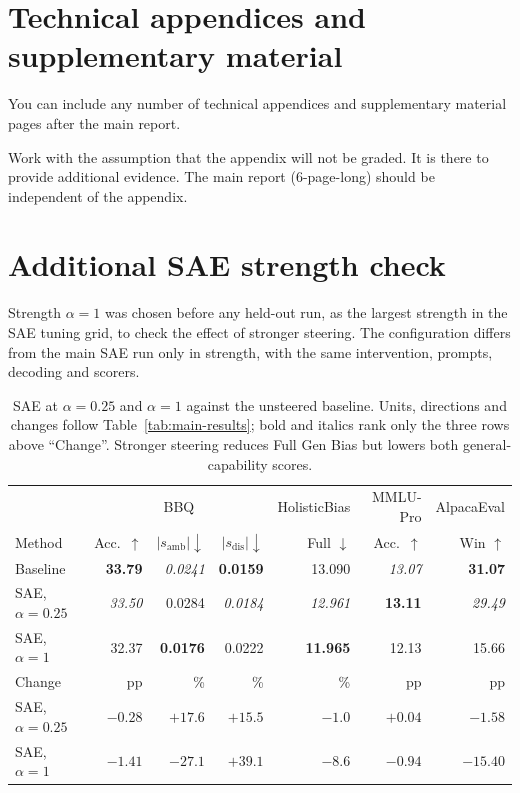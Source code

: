 \documentclass{article}
\begin{document}
\appendix

\section{Technical appendices and supplementary material}
You can include any number of technical appendices and supplementary material pages after the main report.

Work with the assumption that the appendix will not be graded. It is there to provide additional evidence. The main report (6-page-long) should be independent of the appendix.



\clearpage
\section{Additional SAE strength check}
\label{app:sae}

Strength $\alpha=1$ was chosen before any held-out run, as the largest strength in the SAE tuning grid, to check the effect of stronger steering. The configuration differs from the main SAE run only in strength, with the same intervention, prompts, decoding and scorers.

\begin{table}[h]
  \caption{SAE at $\alpha=0.25$ and $\alpha=1$ against the unsteered baseline. Units, directions and changes follow Table~\ref{tab:main-results}; bold and italics rank only the three rows above ``Change''. Stronger steering reduces Full Gen Bias but lowers both general-capability scores.}
  \label{tab:sae-extra}
  \centering\small
  \setlength{\tabcolsep}{4pt}
  \begin{tabular}{lrrrrrr}
    \toprule
    & \multicolumn{3}{c}{BBQ} & HolisticBias & MMLU-Pro & AlpacaEval \\
    \cmidrule(lr){2-4}
    Method & Acc.\ $\uparrow$ & $|s_{\text{amb}}|\downarrow$ & $|s_{\text{dis}}|\downarrow$ & Full $\downarrow$ & Acc.\ $\uparrow$ & Win $\uparrow$ \\
    \midrule
    Baseline & \textbf{33.79} & \textit{0.0241} & \textbf{0.0159} & 13.090 & \textit{13.07} & \textbf{31.07} \\
    SAE, $\alpha=0.25$ & \textit{33.50} & 0.0284 & \textit{0.0184} & \textit{12.961} & \textbf{13.11} & \textit{29.49} \\
    SAE, $\alpha=1$ & 32.37 & \textbf{0.0176} & 0.0222 & \textbf{11.965} & 12.13 & 15.66 \\
    \midrule
    Change & pp & \% & \% & \% & pp & pp \\
    SAE, $\alpha=0.25$ & $-0.28$ & $+17.6$ & $+15.5$ & $-1.0$ & $+0.04$ & $-1.58$ \\
    SAE, $\alpha=1$ & $-1.41$ & $-27.1$ & $+39.1$ & $-8.6$ & $-0.94$ & $-15.40$ \\
    \bottomrule
  \end{tabular}
\end{table}
\end{document}
